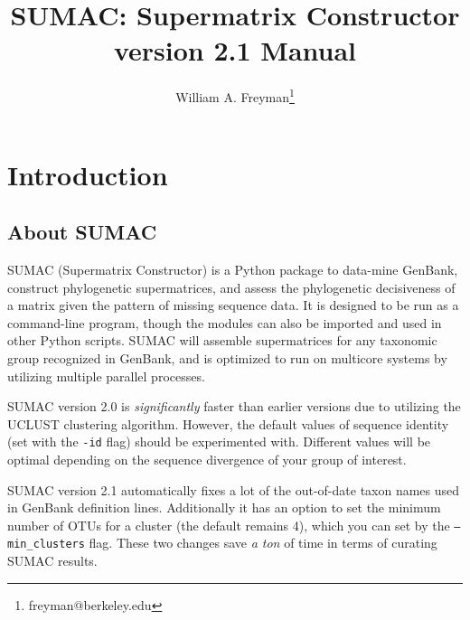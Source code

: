 \documentclass[10pt]{report}
\title{SUMAC: Supermatrix Constructor version 2.1 Manual}
\author{William A. Freyman\thanks{freyman@berkeley.edu}}
\affil{Department of Integrative Biology, University of California, Berkeley}
\date{}
\begin{document}
\maketitle

\tableofcontents


\chapter{Introduction}

\section{About SUMAC}

SUMAC (Supermatrix Constructor) is a Python package to 
data-mine GenBank, construct phylogenetic supermatrices, and assess the phylogenetic decisiveness of a matrix given the pattern of missing sequence data.
It is designed to be run as a command-line program, though
the modules can also be imported and used in other Python scripts.
SUMAC will assemble
supermatrices for any taxonomic group recognized in GenBank,
and is optimized to run on multicore systems by utilizing multiple parallel processes.

SUMAC version 2.0 is \textit{significantly} faster than earlier versions
due to utilizing the UCLUST clustering algorithm. However, the
default values of sequence identity (set with the \texttt{-id} flag)
should be experimented with. Different values will be optimal
depending on the sequence divergence of your group of interest.

SUMAC version 2.1 
automatically fixes a lot of the out-of-date taxon names used in GenBank definition lines. 
Additionally it has an option to set the minimum number of OTUs for a cluster (the default remains 4), 
which you can set by the \texttt{--min\_clusters} flag. 
These two changes save \textit{a ton} of time in terms of curating SUMAC results.
\end{document}
